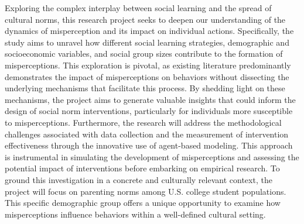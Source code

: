 Exploring the complex interplay between social learning and the spread of cultural norms, this research project seeks to deepen our understanding of the dynamics of misperception and its impact on individual actions. Specifically, the study aims to unravel how different social learning strategies, demographic and socioeconomic variables, and social group sizes contribute to the formation of misperceptions. This exploration is pivotal, as existing literature predominantly demonstrates the impact of misperceptions on behaviors without dissecting the underlying mechanisms that facilitate this process. By shedding light on these mechanisms, the project aims to generate valuable insights that could inform the design of social norm interventions, particularly for individuals more susceptible to misperceptions. Furthermore, the research will address the methodological challenges associated with data collection and the measurement of intervention effectiveness through the innovative use of agent-based modeling. This approach is instrumental in simulating the development of misperceptions and assessing the potential impact of interventions before embarking on empirical research. To ground this investigation in a concrete and culturally relevant context, the project will focus on parenting norms among U.S. college student populations. This specific demographic group offers a unique opportunity to examine how misperceptions influence behaviors within a well-defined cultural setting.

